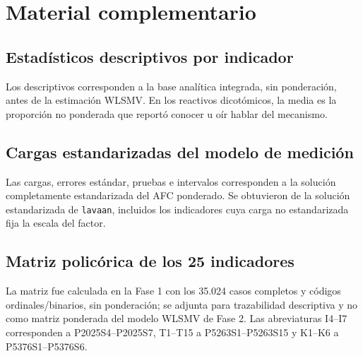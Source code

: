 \documentclass[11pt,letterpaper]{article}
\begin{document}



\appendix
\section{Material complementario}
\label{app:complementario}
\subsection{Estadísticos descriptivos por indicador}
\label{ap:descriptivos}
Los descriptivos corresponden a la base analítica integrada, sin ponderación, antes de la estimación WLSMV. En los reactivos dicotómicos, la media es la proporción no ponderada que reportó conocer u oír hablar del mecanismo.


\subsection{Cargas estandarizadas del modelo de medición}
Las cargas, errores estándar, pruebas e intervalos corresponden a la solución completamente estandarizada del AFC ponderado. Se obtuvieron de la solución estandarizada de \texttt{lavaan}, incluidos los indicadores cuya carga no estandarizada fija la escala del factor.


\subsection{Matriz policórica de los 25 indicadores}
\label{ap:policoricas}
La matriz fue calculada en la Fase 1 con los 35.024 casos completos y códigos ordinales/binarios, sin ponderación; se adjunta para trazabilidad descriptiva y no como matriz ponderada del modelo WLSMV de Fase 2. Las abreviaturas I4--I7 corresponden a P2025S4--P2025S7, T1--T15 a P5263S1--P5263S15 y K1--K6 a P5376S1--P5376S6.
\begin{landscape}

\clearpage
{}
\end{landscape}
\end{document}
